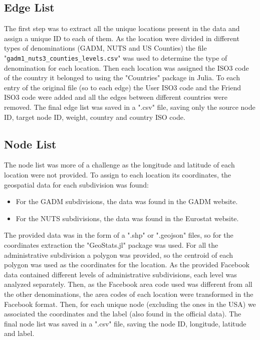 \subsection{Edge List}
The first step was to extract all the unique locations present in the data and assign a unique ID to each of them. As the location were divided in different types of denominations (GADM\cite{GADM}, NUTS\cite{NUTS} and US Counties) the file "\texttt{gadm1\_nuts3\_counties\_levels.csv}" was used to determine the type of denomination for each location.
Then each location was assigned the ISO3 code of the country it belonged to using the "Countries" package in Julia\cite{countries_package}.
To each entry of the original file (so to each edge) the User ISO3 code and the Friend ISO3 code were added and all the edges between different countries were removed.
The final edge list was saved in a ".csv" file, saving only the source node ID, target node ID, weight, country and country ISO code.

\subsection{Node List}
The node list was more of a challenge as the longitude and latitude of each location were not provided.
To assign to each location its coordinates, the geospatial data for each subdivision was found:
\begin{itemize}
    \item For the GADM subdivisions, the data was found in the GADM website\cite{GADM}.
    \item For the NUTS subdivisions, the data was found in the Eurostat website\cite{NUTS}.
\end{itemize}
The provided data was in the form of a ".shp" or ".geojson" files, so for the coordinates extraction the "GeoStats.jl" package was used\cite{geostats_package}. For all the administrative subdivision a polygon was provided, so the centroid of each polygon was used as the coordinates for the location. As the provided Facebook data contained different levels of administrative subdivisions, each level was analyzed separately.
Then, as the Facebook area code used was different from all the other denominations, the area codes of each location were transformed in the Facebook format.
Then, for each unique node (excluding the ones in the USA) we associated the coordinates and the label (also found in the official data).
The final node list was saved in a ".csv" file, saving the node ID, longitude, latitude and label.

